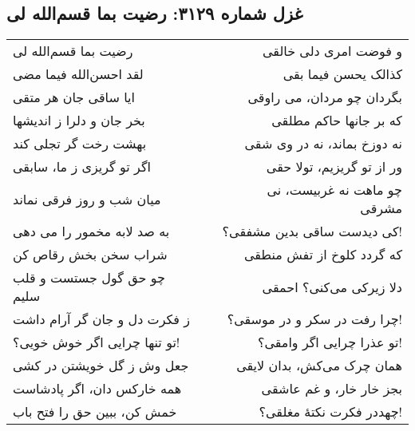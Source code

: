 \begin{center}
\section*{غزل شماره ۳۱۲۹: رضیت بما قسم‌الله لی}
\label{sec:3129}
\begin{longtable}{l p{0.5cm} r}
رضیت بما قسم‌الله لی
&&
و فوضت امری دلی خالقی
\\
لقد احسن‌الله فیما مضی
&&
کذالک یحسن فیما بقی
\\
ایا ساقی جان هر متقی
&&
بگردان چو مردان، می راوقی
\\
بخر جان و دلرا ز اندیشها
&&
که بر جانها حاکم مطلقی
\\
بهشت رخت گر تجلی کند
&&
نه دوزخ بماند، نه در وی شقی
\\
اگر تو گریزی ز ما، سابقی
&&
ور از تو گریزیم، تولا حقی
\\
میان شب و روز فرقی نماند
&&
چو ماهت نه غربیست، نی مشرقی
\\
به صد لابه مخمور را می دهی
&&
کی دیدست ساقی بدین مشفقی؟!
\\
شراب سخن بخش رقاص کن
&&
که گردد کلوخ از تفش منطقی
\\
چو حق گول جستست و قلب سلیم
&&
دلا زیرکی می‌کنی؟ احمقی
\\
ز فکرت دل و جان گر آرام داشت
&&
چرا رفت در سکر و در موسقی؟!
\\
تو تنها چرایی اگر خوش خویی؟!
&&
تو عذرا چرایی اگر وامقی؟!
\\
جعل وش ز گل خویشتن در کشی
&&
همان چرک می‌کش، بدان لایقی
\\
همه خارکس دان، اگر پادشاست
&&
بجز خار خار، و غم عاشقی
\\
خمش کن، ببین حق را فتح باب
&&
چهددر فکرت نکتهٔ مغلقی؟!
\\
\end{longtable}
\end{center}
